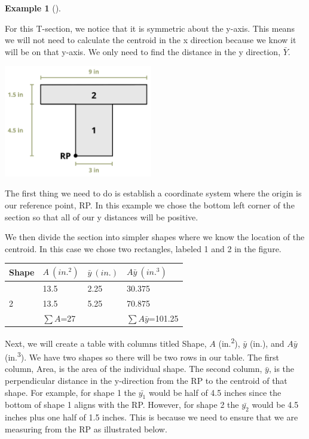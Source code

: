 \documentclass[
  letterpaper,
  DIV=11,
  numbers=noendperiod]{scrreprt}
\theoremstyle{definition}
\newtheorem{example}{Example}[chapter]
\theoremstyle{remark}
\begin{document}
\begin{tcolorbox}
\begin{example}[]
\begin{tcolorbox}
For this T-section, we notice that it is symmetric about the y-axis.
This means we will not need to calculate the centroid in the x direction
because we know it will be on that y-axis. We only need to find the
distance in the y direction, \(\bar{Y}\).

\begin{center}
\includegraphics[width=2.55208in,height=\textheight]{images/CH 8 PNGs/example 8.1 part 2.png}
\end{center}

The first thing we need to do is establish a coordinate system where the
origin is our reference point, RP. In this example we chose the bottom
left corner of the section so that all of our y distances will be
positive.

We then divide the section into simpler shapes where we know the
location of the centroid. In this case we chose two rectangles, labeled
1 and 2 in the figure.

\begin{longtable}[]{@{}llll@{}}
\toprule\noalign{}
Shape & \(A{~(in.^2)}\) & \(\bar{y}{~(in.)}\) &
\(A\bar{y}{~(in.^3)}\) \\
\midrule\noalign{}
\endhead
\bottomrule\noalign{}
\endlastfoot
1 & 13.5 & 2.25 & 30.375 \\
2 & 13.5 & 5.25 & 70.875 \\
& \(\sum A\)=27 & & \(\sum A\bar{y}\)=101.25 \\
\end{longtable}

Next, we will create a table with columns titled Shape, \(A\)
(in.\textsuperscript{2}), \(\bar{y}\) (in.), and \(A\bar{y}\)
(in.\textsuperscript{3}). We have two shapes so there will be two rows
in our table. The first column, Area, is the area of the individual
shape. The second column, \(\bar{y}\), is the perpendicular distance in
the y-direction from the RP to the centroid of that shape. For example,
for shape 1 the \(\bar{y_1}\) would be half of 4.5 inches since the
bottom of shape 1 aligns with the RP. However, for shape 2 the
\(\bar{y_2}\) would be 4.5 inches plus one half of 1.5 inches. This is
because we need to ensure that we are measuring from the RP as
illustrated below.


\end{tcolorbox}
\end{example}
\end{tcolorbox}
\end{document}
